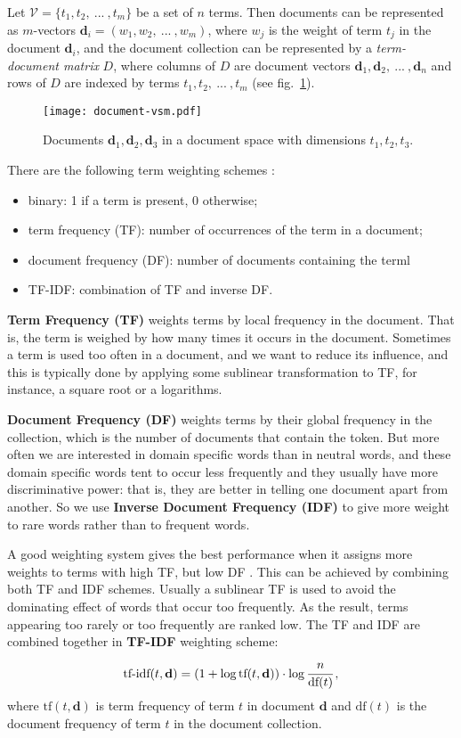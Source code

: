Let $\mathcal V = \{t_1, t_2, \ ... \ , t_m \}$ be a set of $n$ terms.
Then documents can be represented as $m$-vectors
$\mathbf d_i = (w_1, w_2, \ ... \ , w_m)$, where $w_j$ is the weight
of term $t_j$ in the document $\mathbf d_i$,
and the document collection can be represented by a \emph{term-document matrix}
$D$, where columns of $D$ are document vectors
$\mathbf d_1, \mathbf d_2, \ ... \ , \mathbf d_n$
and rows of $D$ are indexed by terms $t_1, t_2, \ ... \ , t_m$
(see fig.~\ref{fig:document-vsm}).

\begin{figure}[h]
\centering\texttt{[image: document-vsm.pdf]}
\caption{Documents $\mathbf d_1, \mathbf d_2, \mathbf d_3$
in a document space with dimensions $t_1, t_2, t_3$.}
\label{fig:document-vsm}
\end{figure}


There are the following term weighting schemes \cite{manning2008introduction}:

\begin{itemize}
\itemsep1pt\parskip0pt
  \item binary: 1 if a term is present, 0 otherwise;
  \item term frequency (TF): number of occurrences of the term in a document;
  \item document frequency (DF): number of documents containing the terml
  \item TF-IDF: combination of TF and inverse DF.
\end{itemize}


\textbf{Term Frequency (TF)} weights terms by local frequency in the document.
That is, the term is weighed by how many times it occurs in the document.
Sometimes a term is used too often in a document, and we want to
reduce its influence, and this is typically done by applying some
sublinear transformation to TF, for instance, a square root or a logarithms.

\textbf{Document Frequency (DF)} weights terms by their global frequency
in the collection, which is the number of documents that contain the token.
But more often we are interested in domain specific words than in neutral words,
and these domain specific words tent to occur less frequently and they usually
have more discriminative power: that is, they are better in telling one document apart from another. So we use \textbf{Inverse Document Frequency (IDF)} to give more
weight to rare words rather than to frequent words.

A good weighting system gives the best performance when it assigns
more weights to terms with high TF, but low DF \cite{salton1988term}.
This can be achieved by combining both TF and IDF
schemes. Usually a sublinear TF is used to avoid the dominating effect of
words that occur too frequently. As the result, terms appearing
too rarely or too frequently are ranked low.
The TF and IDF are combined together in \textbf{TF-IDF} weighting scheme:
$$\text{tf-idf}(t, \mathbf d) = (1 + \log \text{tf}(t, \mathbf d)) \cdot \log \cfrac{n}{\text{df}(t)} \, ,$$
where $\text{tf}(t, \mathbf d)$ is term frequency of term $t$ in document
$\mathbf d$ and $\text{df}(t)$ is the document frequency of term $t$ in
the document collection.


